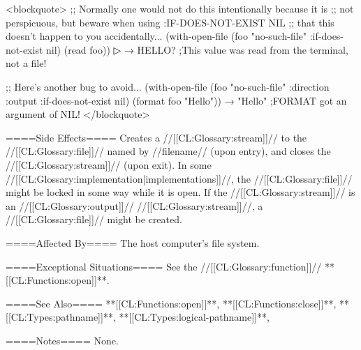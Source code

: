<blockquote> ;; Normally one would not do this intentionally because it is ;; not perspicuous, but beware when using :IF-DOES-NOT-EXIST NIL ;; that this doesn't happen to you accidentally... (with-open-file (foo "no-such-file" :if-does-not-exist nil) (read foo))
▷  → HELLO? ;This value was read from the terminal, not a file!

;; Here's another bug to avoid... (with-open-file (foo "no-such-file" :direction :output :if-does-not-exist nil) (format foo "Hello")) → "Hello" ;FORMAT got an argument of NIL! </blockquote>

====Side Effects====
Creates a //[[CL:Glossary:stream]]// to the //[[CL:Glossary:file]]// named by //filename// (upon entry), and closes the //[[CL:Glossary:stream]]// (upon exit). In some //[[CL:Glossary:implementation|implementations]]//, the //[[CL:Glossary:file]]// might be locked in some way while it is open. If the //[[CL:Glossary:stream]]// is an //[[CL:Glossary:output]]// //[[CL:Glossary:stream]]//, a //[[CL:Glossary:file]]// might be created.

====Affected By====
The host computer's file system.

====Exceptional Situations====
See the //[[CL:Glossary:function]]// **[[CL:Functions:open]]**.

====See Also====
**[[CL:Functions:open]]**, **[[CL:Functions:close]]**, **[[CL:Types:pathname]]**, **[[CL:Types:logical-pathname]]**, {\secref\PathnamesAsFilenames}

====Notes====
None.

           

